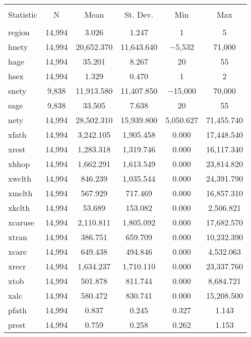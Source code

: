 \documentclass[]{article}
\begin{document}
\begin{table}[!htbp] \centering 
  \caption{} 
  \label{} 
\begin{tabular}{@{\extracolsep{5pt}}lccccc} 
\\[-1.8ex]\hline 
\hline \\[-1.8ex] 
Statistic & \multicolumn{1}{c}{N} & \multicolumn{1}{c}{Mean} & \multicolumn{1}{c}{St. Dev.} & \multicolumn{1}{c}{Min} & \multicolumn{1}{c}{Max} \\ 
\hline \\[-1.8ex] 
region & 14,994 & 3.026 & 1.247 & 1 & 5 \\ 
hnety & 14,994 & 20,652.370 & 11,643.640 & $-$5,532 & 71,000 \\ 
hage & 14,994 & 35.201 & 8.267 & 20 & 55 \\ 
hsex & 14,994 & 1.329 & 0.470 & 1 & 2 \\ 
snety & 9,838 & 11,913.580 & 11,407.850 & $-$15,000 & 70,000 \\ 
sage & 9,838 & 33.505 & 7.638 & 20 & 55 \\ 
nety & 14,994 & 28,502.310 & 15,939.800 & 5,050.627 & 71,455.740 \\ 
xfath & 14,994 & 3,242.105 & 1,905.458 & 0.000 & 17,448.540 \\ 
xrest & 14,994 & 1,283.318 & 1,319.746 & 0.000 & 16,117.340 \\ 
xhhop & 14,994 & 1,662.291 & 1,613.549 & 0.000 & 23,814.820 \\ 
xwclth & 14,994 & 846.239 & 1,035.544 & 0.000 & 24,391.790 \\ 
xmclth & 14,994 & 567.929 & 717.469 & 0.000 & 16,857.310 \\ 
xkclth & 14,994 & 53.689 & 153.082 & 0.000 & 2,506.821 \\ 
xcaruse & 14,994 & 2,110.811 & 1,805.092 & 0.000 & 17,682.570 \\ 
xtran & 14,994 & 386.751 & 659.709 & 0.000 & 10,232.390 \\ 
xcare & 14,994 & 649.438 & 494.846 & 0.000 & 4,532.063 \\ 
xrecr & 14,994 & 1,634.237 & 1,710.110 & 0.000 & 23,337.760 \\ 
xtob & 14,994 & 501.878 & 811.744 & 0.000 & 8,684.721 \\ 
xalc & 14,994 & 580.472 & 830.741 & 0.000 & 15,208.500 \\ 
pfath & 14,994 & 0.837 & 0.245 & 0.327 & 1.143 \\ 
prest & 14,994 & 0.759 & 0.258 & 0.262 & 1.153 \\ 

\end{tabular}
\end{table}
\end{document}
